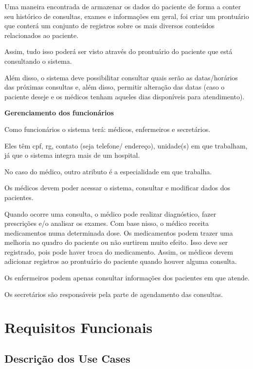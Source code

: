 \documentclass[11pt,a4paper]{report}
\begin{document}
Uma maneira encontrada de armazenar os dados do paciente de forma a conter seu histórico de consultas, exames e informações em geral, foi criar um prontuário que conterá um conjunto de registros sobre os mais diversos conteúdos relacionados ao paciente. 

Assim, tudo isso poderá ser visto através do prontuário do paciente que está consultando o sistema. 

Além disso, o sistema deve possibilitar consultar quais serão as datas/horários das próximas consultas e, além disso, permitir alteração das datas (caso o paciente deseje e os médicos tenham aqueles dias disponíveis para atendimento).
\newline

\textbf{Gerenciamento dos funcionários}
\newline

Como funcionários o sistema terá: médicos, enfermeiros e secretários.

Eles têm cpf, rg, contato (seja telefone/ endereço), unidade(s) em que trabalham, já que o sistema integra mais de um hospital.

No caso do médico, outro atributo é a especialidade em que trabalha.

Os médicos devem poder acessar o sistema, consultar e modificar dados dos pacientes. 

Quando ocorre uma consulta, o médico pode realizar diagnóstico, fazer prescrições e/o analisar os exames. Com base nisso, o médico receita medicamentos numa determinada dose. Os medicamentos podem trazer uma melhoria no quadro do paciente ou não surtirem muito efeito. Isso deve ser registrado, pois pode haver troca do medicamento. Assim, os médicos devem adicionar registros ao prontuário do paciente quando houver alguma consulta. 


Os enfermeiros podem apenas consultar informações dos pacientes em que atende. 



Os secretários são responsáveis pela parte de agendamento das consultas.





\chapter*{Requisitos Funcionais}

\section{Descrição dos Use Cases}
\end{document}
